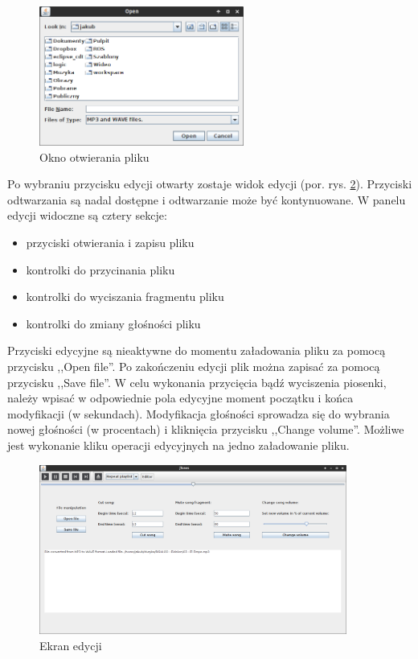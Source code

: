 \documentclass[12pt,a4paper,notitlepage]{article}
\begin{document}
\begin{figure}[hb]
 \centering
 \includegraphics[width=0.6\textwidth]{img/open.png}
 \caption{Okno otwierania pliku}
 \label{fig:open}
\end{figure}

Po wybraniu przycisku edycji otwarty zostaje widok edycji (por. rys. \ref{fig:editor}). Przyciski odtwarzania są nadal dostępne i odtwarzanie może być kontynuowane. W panelu edycji widoczne
są cztery sekcje:
\begin{itemize}
 \item przyciski otwierania i zapisu pliku
 \item kontrolki do przycinania pliku
 \item kontrolki do wyciszania fragmentu pliku
 \item kontrolki do zmiany głośności pliku
\end{itemize}

Przyciski edycyjne są nieaktywne do momentu załadowania pliku za pomocą przycisku ,,Open file''. Po zakończeniu edycji plik można zapisać za pomocą przycisku ,,Save file''. 
W celu wykonania przycięcia bądź wyciszenia piosenki, należy wpisać w odpowiednie pola edycyjne moment początku i końca modyfikacji (w sekundach). Modyfikacja głośności sprowadza się do 
wybrania nowej głośności (w procentach) i kliknięcia przycisku ,,Change volume''. Możliwe jest wykonanie kliku operacji edycyjnych na jedno załadowanie pliku.

\begin{figure}[hb]
 \centering
 \includegraphics[width=0.9\textwidth]{img/editor.png}
 \caption{Ekran edycji}
 \label{fig:editor}
\end{figure}
\end{document}
